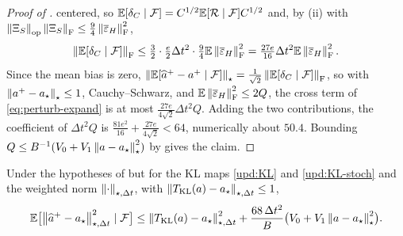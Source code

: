 \begin{proof}[Proof of ]
centered, so $\mathbb{E}[\delta_C\mid\mathcal{F}]=C^{1/2}\mathbb{E}[\mathcal R\mid\mathcal{F}]C^{1/2}$ and, by
(ii) with $\left\lVert \Xi_S\right\rVert_{\mathrm{op}}\left\lVert \Xi_S\right\rVert_{\mathrm{F}}\leq\tfrac94\left\lVert \overline\varepsilon_H\right\rVert_{\mathrm{F}}^2$,
\[
    \left\lVert \mathbb{E}[\delta_C\mid\mathcal{F}]\right\rVert_{\mathrm{F}}\leq\tfrac32\cdot\tfrac e2\Delta t^2\cdot\tfrac94\mathbb{E}\left\lVert \overline\varepsilon_H\right\rVert_{\mathrm{F}}^2
    =\tfrac{27e}{16}\Delta t^2\mathbb{E}\left\lVert \overline\varepsilon_H\right\rVert_{\mathrm{F}}^2 .
\]
Since the mean bias is zero, $\left\lVert \mathbb{E}[\widehat a^+-a^+\mid\mathcal{F}]\right\rVert_\star=\tfrac1{\sqrt2}\left\lVert \mathbb{E}[\delta_C\mid\mathcal{F}]\right\rVert_{\mathrm{F}}$,
so with $\left\lVert a^+-a_\star\right\rVert_\star\leq1$, Cauchy--Schwarz, and
$\mathbb{E}\left\lVert \overline\varepsilon_H\right\rVert_{\mathrm{F}}^2\leq2Q$, the cross term of \eqref{eq:perturb-expand} is at
most $\tfrac{27e}{4\sqrt2}\Delta t^2Q$.
Adding the two contributions, the coefficient of $\Delta t^2Q$ is
$\tfrac{81e^2}{16}+\tfrac{27e}{4\sqrt2}<64$, numerically about $50.4$. Bounding
$Q\leq B^{-1}(V_0+V_1\left\lVert a-a_\star\right\rVert_\star^2)$ by  gives the claim.
\end{proof}

\begin{lemma}
\label{lem:perturb-KL}
Under the hypotheses of  but for the KL maps \eqref{upd:KL} and
\eqref{upd:KL-stoch} and the weighted norm $\left\lVert \cdot\right\rVert_{\star,\Delta t}$, with
$\left\lVert T_{\mathrm{KL}}(a)-a_\star\right\rVert_{\star,\Delta t}\leq1$,
\[
    \mathbb{E}\bigl[\left\lVert \widehat a^+-a_\star\right\rVert_{\star,\Delta t}^2\mid\mathcal{F}\bigr]
    \leq\left\lVert T_{\mathrm{KL}}(a)-a_\star\right\rVert_{\star,\Delta t}^2+\frac{68\,\Delta t^2}{B}\bigl(V_0+V_1\left\lVert a-a_\star\right\rVert_\star^2\bigr).
\]
\end{lemma}


